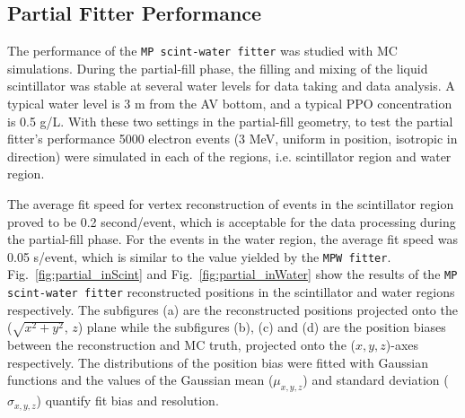 \subsection{Partial Fitter Performance}

The performance of the \texttt{MP scint-water fitter} was studied with MC simulations. During the partial-fill phase, the filling and mixing of the liquid scintillator was stable at several water levels for data taking and data analysis. A typical water level is 3 m from the AV bottom, and a typical PPO concentration is 0.5 g/L. With these two settings in the partial-fill geometry, to test the partial fitter's performance 5000  electron events (3 MeV, uniform in position, isotropic in direction) were simulated in each of the regions, i.e. scintillator region and water region.

The average fit speed for vertex reconstruction of events in the scintillator region proved to be 0.2 second/event, which is acceptable for the data processing during the partial-fill phase. For the events in the water region, the average fit speed was 0.05 s/event, which is similar to the value yielded by the \texttt{MPW fitter}. Fig.~\ref{fig:partial_inScint} and Fig.~\ref{fig:partial_inWater} show the results of the \texttt{MP scint-water fitter} reconstructed positions in the scintillator and water regions respectively. The subfigures (a) are the reconstructed positions projected onto the ($\sqrt{x^2+y^2}$, $z$) plane while the subfigures (b), (c) and (d) are the position biases between the reconstruction and MC truth, projected onto the ($x,y,z$)-axes respectively. The distributions of the position bias were fitted with Gaussian functions and the values of the Gaussian mean ($\mu_{x,y,z}$) and standard deviation ($\sigma_{x,y,z}$) quantify fit bias and resolution.

